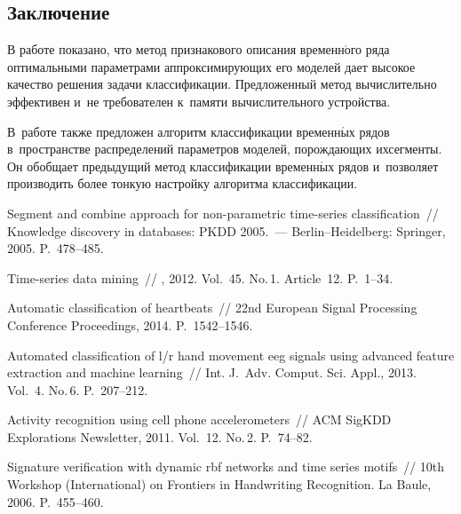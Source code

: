 \begin{multicols}{2}

\section{Заключение}

В работе показано, что метод признакового описания временн$\acute{\mbox{о}}$го 
ряда оптимальными параметрами аппроксимирующих его моделей дает высокое 
качество решения задачи классификации.
Предложенный метод вычислительно эффективен и~не требователен к~памяти 
вычислительного устройства.

В~работе также предложен алгоритм классификации временн$\acute{\mbox{ы}}$х рядов в~пространстве 
распределений параметров моделей, порождающих их\linebreak сегменты. 
Он обобщает предыдущий метод классификации временн$\acute{\mbox{ы}}$х рядов и~позволяет 
производить более тонкую настройку алгоритма клас\-си\-фи\-кации.
{ %

}

{\small\frenchspacing
 {%
 \begin{thebibliography}{99}
 Segment and combine approach for non-parametric time-series classification~//
{Knowledge discovery in databases: PKDD 2005}.~--- Berlin--Heidelberg: Springer, 2005. 
P.~478--485.

Time-series data mining~//
, 2012. Vol.~45. No.\,1. Article~12. P.~1--34.

Automatic classification of heartbeats~//
{22nd European Signal Processing Conference Proceedings}, 2014. P.~1542--1546.

 Automated classification of l/r hand movement eeg signals using advanced 
 feature extraction and machine learning~//
{Int. J.~Adv. Comput. Sci. Appl.}, 2013. Vol.~4. No.\,6. P.~207--212.

Activity recognition using cell phone accelerometers~//
{ACM SigKDD Explorations Newsletter}, 2011. Vol.~12. No.\,2. P.~74--82.

 Signature verification with dynamic rbf networks and time series motifs~//
{10th  Workshop (International) on Frontiers in Handwriting Recognition}.
 La Baule, 2006. 
P.~455--460.


\end{thebibliography}}}
\end{multicols}
